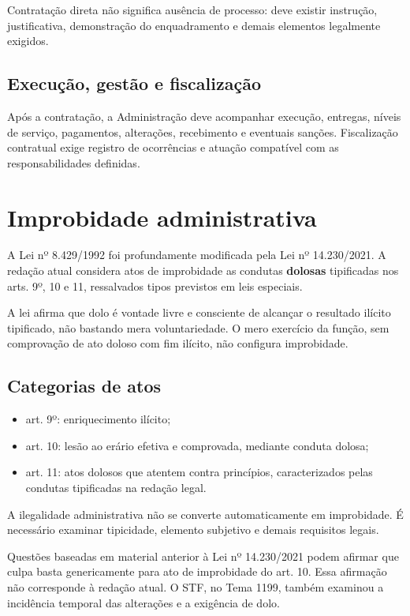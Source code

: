 Contratação direta não significa ausência de processo: deve existir instrução, justificativa, demonstração do enquadramento e demais elementos legalmente exigidos.

\subsection{Execução, gestão e fiscalização}

Após a contratação, a Administração deve acompanhar execução, entregas, níveis de serviço, pagamentos, alterações, recebimento e eventuais sanções. Fiscalização contratual exige registro de ocorrências e atuação compatível com as responsabilidades definidas.

\section{Improbidade administrativa}

A Lei nº 8.429/1992 foi profundamente modificada pela Lei nº 14.230/2021. A redação atual considera atos de improbidade as condutas \textbf{dolosas} tipificadas nos arts. 9º, 10 e 11, ressalvados tipos previstos em leis especiais.

A lei afirma que dolo é vontade livre e consciente de alcançar o resultado ilícito tipificado, não bastando mera voluntariedade. O mero exercício da função, sem comprovação de ato doloso com fim ilícito, não configura improbidade.

\subsection{Categorias de atos}

\begin{itemize}
\item art. 9º: enriquecimento ilícito;
\item art. 10: lesão ao erário efetiva e comprovada, mediante conduta dolosa;
\item art. 11: atos dolosos que atentem contra princípios, caracterizados pelas condutas tipificadas na redação legal.
\end{itemize}

A ilegalidade administrativa não se converte automaticamente em improbidade. É necessário examinar tipicidade, elemento subjetivo e demais requisitos legais.

\begin{cebraspe}
Questões baseadas em material anterior à Lei nº 14.230/2021 podem afirmar que culpa basta genericamente para ato de improbidade do art. 10. Essa afirmação não corresponde à redação atual. O STF, no Tema 1199, também examinou a incidência temporal das alterações e a exigência de dolo.
\end{cebraspe}

